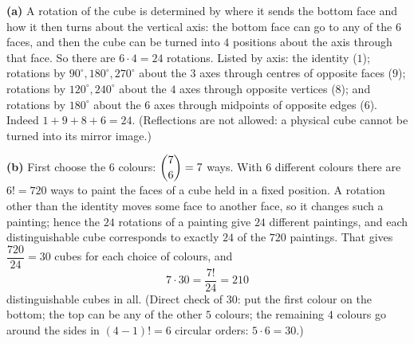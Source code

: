 \textbf{(a)} A rotation of the cube is determined by where it sends the bottom face and how it then turns about the vertical axis: the bottom face can go to any of the $6$ faces, and then the cube can be turned into $4$ positions about the axis through that face. So there are $6\cdot4=24$ rotations. Listed by axis: the identity ($1$); rotations by $90^\circ,180^\circ,270^\circ$ about the $3$ axes through centres of opposite faces ($9$); rotations by $120^\circ,240^\circ$ about the $4$ axes through opposite vertices ($8$); and rotations by $180^\circ$ about the $6$ axes through midpoints of opposite edges ($6$). Indeed $1+9+8+6=24$. (Reflections are not allowed: a physical cube cannot be turned into its mirror image.)

\textbf{(b)} First choose the $6$ colours: $\dbinom{7}{6}=7$ ways. With $6$ different colours there are $6!=720$ ways to paint the faces of a cube held in a fixed position. A rotation other than the identity moves some face to another face, so it changes such a painting; hence the $24$ rotations of a painting give $24$ different paintings, and each distinguishable cube corresponds to exactly $24$ of the $720$ paintings. That gives $\dfrac{720}{24}=30$ cubes for each choice of colours, and
\[
7\cdot30=\dfrac{7!}{24}=\boxed{210}
\]
distinguishable cubes in all. (Direct check of $30$: put the first colour on the bottom; the top can be any of the other $5$ colours; the remaining $4$ colours go around the sides in $(4-1)!=6$ circular orders: $5\cdot6=30$.)
